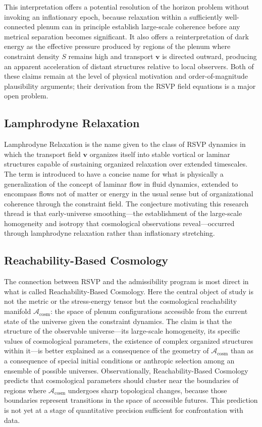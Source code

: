 \documentclass[11pt, oneside]{book}
\theoremstyle{definition}
\theoremstyle{remark}
\begin{document}
This interpretation offers a potential resolution of the horizon problem without invoking an inflationary epoch, because relaxation within a sufficiently well-connected plenum can in principle establish large-scale coherence before any metrical separation becomes significant. It also offers a reinterpretation of dark energy as the effective pressure produced by regions of the plenum where constraint density $S$ remains high and transport $\mathbf{v}$ is directed outward, producing an apparent acceleration of distant structures relative to local observers. Both of these claims remain at the level of physical motivation and order-of-magnitude plausibility arguments; their derivation from the RSVP field equations is a major open problem.

\subsection{Lamphrodyne Relaxation}

Lamphrodyne Relaxation is the name given to the class of RSVP dynamics in which the transport field $\mathbf{v}$ organizes itself into stable vortical or laminar structures capable of sustaining organized relaxation over extended timescales. The term is introduced to have a concise name for what is physically a generalization of the concept of laminar flow in fluid dynamics, extended to encompass flows not of matter or energy in the usual sense but of organizational coherence through the constraint field. The conjecture motivating this research thread is that early-universe smoothing—the establishment of the large-scale homogeneity and isotropy that cosmological observations reveal—occurred through lamphrodyne relaxation rather than inflationary stretching.

\subsection{Reachability-Based Cosmology}

The connection between RSVP and the admissibility program is most direct in what is called Reachability-Based Cosmology. Here the central object of study is not the metric or the stress-energy tensor but the cosmological reachability manifold $\mathcal{A}_{\text{cosm}}$: the space of plenum configurations accessible from the current state of the universe given the constraint dynamics. The claim is that the structure of the observable universe—its large-scale homogeneity, its specific values of cosmological parameters, the existence of complex organized structures within it—is better explained as a consequence of the geometry of $\mathcal{A}_{\text{cosm}}$ than as a consequence of special initial conditions or anthropic selection among an ensemble of possible universes. Observationally, Reachability-Based Cosmology predicts that cosmological parameters should cluster near the boundaries of regions where $\mathcal{A}_{\text{cosm}}$ undergoes sharp topological changes, because those boundaries represent transitions in the space of accessible futures. This prediction is not yet at a stage of quantitative precision sufficient for confrontation with data.
\end{document}
